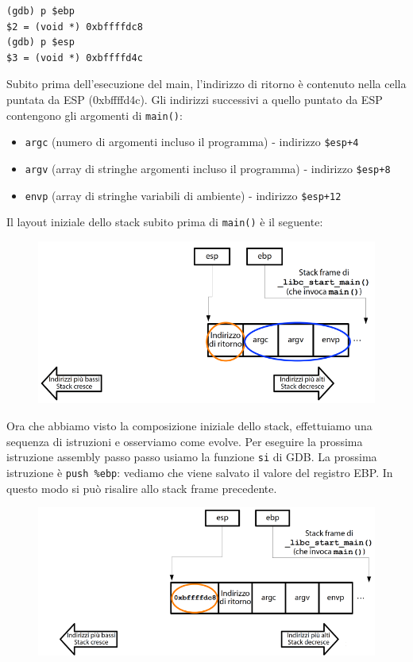 \begin{mdframed}[backgroundcolor=white!20,shadow=false]
\begin{lstlisting}
(gdb) p $ebp
$2 = (void *) 0xbffffdc8
(gdb) p $esp
$3 = (void *) 0xbffffd4c
\end{lstlisting}
\end{mdframed}

Subito prima dell'esecuzione del main, l'indirizzo di ritorno è contenuto nella cella puntata da ESP (0xbffffd4c). Gli indirizzi successivi a quello puntato da ESP contengono gli argomenti di \texttt{main()}:
\begin{itemize}
    \item \texttt{argc} (numero di argomenti incluso il programma) - indirizzo \texttt{\$esp+4}
    \item \texttt{argv} (array di stringhe argomenti incluso il programma) - indirizzo \texttt{\$esp+8}
    \item \texttt{envp} (array di stringhe variabili di ambiente) - indirizzo \texttt{\$esp+12}
\end{itemize}
Il layout iniziale dello stack subito prima di \texttt{main()} è il seguente:

\begin{figure}[hbpt!]
    \centering
    \includegraphics[width= 0.6 \textwidth]{./Images/cap7/7.8.png}
\end{figure}
\FloatBarrier

Ora che abbiamo visto la composizione iniziale dello stack, effettuiamo una sequenza di istruzioni e osserviamo come evolve. Per eseguire la prossima istruzione assembly passo passo usiamo la funzione \texttt{si} di GDB. La prossima istruzione è \texttt{push \%ebp}: vediamo che viene salvato il valore del registro EBP. In questo modo si può risalire allo stack frame precedente.

\begin{figure}[hbpt!]
    \centering
    \includegraphics[width= 0.6 \textwidth]{./Images/cap7/7.9.png}
\end{figure}
\FloatBarrier

